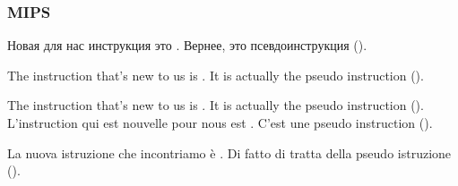 ﻿\subsubsection{MIPS}

\ifdefined\RUSSIAN


Новая для нас инструкция это . Вернее, это псевдоинструкция ().
\fi

\ifdefined\ENGLISH


The instruction that's new to us is . It is actually the pseudo instruction ().
\fi

\ifdefined\FRENCH


The instruction that's new to us is . It is actually the pseudo instruction ().
L'instruction qui est nouvelle pour nous est . C'est une pseudo instruction ().
\fi

\ifdefined\ITALIAN


La nuova istruzione che incontriamo è . Di fatto di tratta della pseudo istruzione ().
\fi
